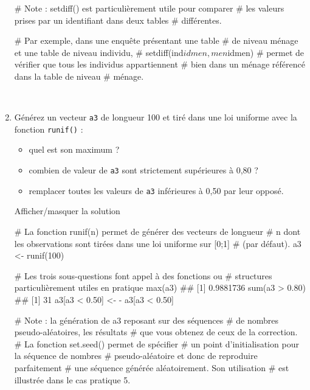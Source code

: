 \documentclass[12pt,]{article}
\newenvironment{Shaded}{}{}
\newcommand{\KeywordTok}[1]{\textcolor[rgb]{0.00,0.00,1.00}{{#1}}}
\newcommand{\DecValTok}[1]{{#1}}
\newcommand{\FloatTok}[1]{{#1}}
\newcommand{\StringTok}[1]{\textcolor[rgb]{0.00,0.50,0.50}{{#1}}}
\newcommand{\CommentTok}[1]{\textcolor[rgb]{0.00,0.50,0.00}{{#1}}}
\newcommand{\NormalTok}[1]{{#1}}
\providecommand{\tightlist}{%
  \setlength{\itemsep}{0pt}\setlength{\parskip}{0pt}}
\begin{document}
\begin{enumerate}
\begin{Shaded}
\begin{Highlighting}[]
\CommentTok{# Note : setdiff() est particulièrement utile pour comparer}
\CommentTok{# les valeurs prises par un identifiant dans deux tables}
\CommentTok{# différentes. }

\CommentTok{# Par exemple,  dans une enquête présentant une table }
\CommentTok{# de niveau ménage et une table de niveau individu, }
\CommentTok{# setdiff(ind$idmen, men$idmen)}
\CommentTok{# permet de vérifier que tous les individus appartiennent}
\CommentTok{# bien dans un ménage référencé dans la table de niveau }
\CommentTok{# ménage.}
\end{Highlighting}
\end{Shaded}

  ~
\item
  Générez un vecteur \texttt{a3} de longueur 100 et tiré dans une loi
  uniforme avec la fonction \texttt{runif()} :

  \begin{itemize}
  \tightlist
  \item
    quel est son maximum ?
  \item
    combien de valeur de \texttt{a3} sont strictement supérieures à 0,80
    ?
  \item
    remplacer toutes les valeurs de \texttt{a3} inférieures à 0,50 par
    leur opposé.
  \end{itemize}

  Afficher/masquer la solution

  \hypertarget{sol5}{}
\begin{Shaded}
\begin{Highlighting}[]
\CommentTok{# La fonction runif(n) permet de générer des vecteurs de longueur}
\CommentTok{# n dont les observations sont tirées dans une loi uniforme sur [0;1]}
\CommentTok{# (par défaut). }
\NormalTok{a3 <-}\StringTok{ }\KeywordTok{runif}\NormalTok{(}\DecValTok{100}\NormalTok{)}

\CommentTok{# Les trois sous-questions font appel à des fonctions ou }
\CommentTok{# structures particulièrement utiles en pratique}
\KeywordTok{max}\NormalTok{(a3)}
\NormalTok{## [1] 0.9881736}
\KeywordTok{sum}\NormalTok{(a3  >}\StringTok{ }\FloatTok{0.80}\NormalTok{)}
\NormalTok{## [1] 31}
\NormalTok{a3[a3 <}\StringTok{ }\FloatTok{0.50}\NormalTok{] <-}\StringTok{ }\NormalTok{-}\StringTok{ }\NormalTok{a3[a3 <}\StringTok{ }\FloatTok{0.50}\NormalTok{]}

\CommentTok{# Note : la génération de a3 reposant sur des séquences}
\CommentTok{# de nombres pseudo-aléatoires, les résultats}
\CommentTok{# que vous obtenez de ceux de la correction.}
\CommentTok{# La fonction set.seed() permet de spécifier}
\CommentTok{# un point d'initialisation pour la séquence de nombres}
\CommentTok{# pseudo-aléatoire et donc de reproduire parfaitement}
\CommentTok{# une séquence générée aléatoirement. Son utilisation}
\CommentTok{# est illustrée dans le cas pratique 5. }
\end{Highlighting}
\end{Shaded}

  ~
\end{enumerate}
\end{document}
